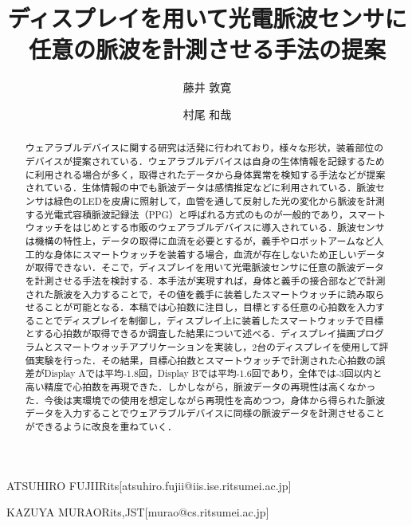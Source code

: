 \documentclass[Japanese,noauthor]{dicomopapers}
\begin{document}
\title{ディスプレイを用いて光電脈波センサに\\任意の脈波を計測させる手法の提案}


\author{藤井 敦寛}{ATSUHIRO FUJII}{Rits}[atsuhiro.fujii@iis.ise.ritsumei.ac.jp]
\author{村尾 和哉}{KAZUYA MURAO}{Rits,JST}[murao@cs.ritsumei.ac.jp]

\begin{abstract}
  ウェアラブルデバイスに関する研究は活発に行われており，様々な形状，装着部位のデバイスが提案されている．ウェアラブルデバイスは自身の生体情報を記録するために利用される場合が多く，取得されたデータから身体異常を検知する手法などが提案されている．生体情報の中でも脈波データは感情推定などに利用されている．脈波センサは緑色のLEDを皮膚に照射して，血管を通して反射した光の変化から脈波を計測する光電式容積脈波記録法（PPG）と呼ばれる方式のものが一般的であり，スマートウォッチをはじめとする市販のウェアラブルデバイスに導入されている．脈波センサは機構の特性上，データの取得に血流を必要とするが，義手やロボットアームなど人工的な身体にスマートウォッチを装着する場合，血流が存在しないため正しいデータが取得できない．そこで，ディスプレイを用いて光電脈波センサに任意の脈波データを計測させる手法を検討する．本手法が実現すれば，身体と義手の接合部などで計測された脈波を入力することで，その値を義手に装着したスマートウォッチに読み取らせることが可能となる．本稿では心拍数に注目し，目標とする任意の心拍数を入力することでディスプレイを制御し，ディスプレイ上に装着したスマートウォッチで目標とする心拍数が取得できるか調査した結果について述べる．ディスプレイ描画プログラムとスマートウォッチアプリケーションを実装し，2台のディスプレイを使用して評価実験を行った．その結果，目標心拍数とスマートウォッチで計測された心拍数の誤差がDisplay Aでは平均-1.8回，Display Bでは平均-1.6回であり，全体では-3回以内と高い精度で心拍数を再現できた．しかしながら，脈波データの再現性は高くなかった．今後は実環境での使用を想定しながら再現性を高めつつ，身体から得られた脈波データを入力することでウェアラブルデバイスに同様の脈波データを計測させることができるように改良を重ねていく．
\end{abstract}

\maketitle

\end{document}
